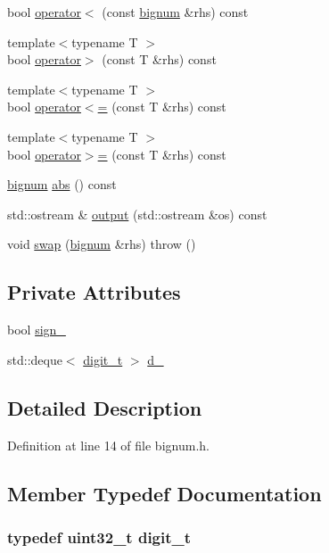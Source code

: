 \begin{DoxyCompactItemize}
\item 
bool \hyperlink{classyuh_1_1bignum_a87acfbb9e05a7e9397fb4197f1aef15e}{operator$<$} (const \hyperlink{classyuh_1_1bignum}{bignum} \&rhs) const 
\item 
{\footnotesize template$<$typename T $>$ }\\bool \hyperlink{classyuh_1_1bignum_a310350936155d69f5221385286b8d41a}{operator$>$} (const \-T \&rhs) const 
\item 
{\footnotesize template$<$typename T $>$ }\\bool \hyperlink{classyuh_1_1bignum_a9b2f684eb4afa9b87a675f6e08b2e736}{operator$<$=} (const \-T \&rhs) const 
\item 
{\footnotesize template$<$typename T $>$ }\\bool \hyperlink{classyuh_1_1bignum_a5dd21374e4d89562f17cfbdd1871b071}{operator$>$=} (const \-T \&rhs) const 
\item 
\hyperlink{classyuh_1_1bignum}{bignum} \hyperlink{classyuh_1_1bignum_acc6083b33ba866bc4a6fff75dc174d47}{abs} () const 
\item 
std\-::ostream \& \hyperlink{classyuh_1_1bignum_a69af91144248517b0357cc4ab7ffa52c}{output} (std\-::ostream \&os) const 
\item 
void \hyperlink{classyuh_1_1bignum_ad64d450e413ed7795476254d1425b677}{swap} (\hyperlink{classyuh_1_1bignum}{bignum} \&rhs)  throw ()
\end{DoxyCompactItemize}
\subsection*{\-Private \-Attributes}
\begin{DoxyCompactItemize}
\item 
bool \hyperlink{classyuh_1_1bignum_abf0bf01a903f906b194bf9f01ff2aab8}{sign\-\_\-}
\item 
std\-::deque$<$ \hyperlink{classyuh_1_1bignum_a918fd2d7b4fcfb6452272f1477745a53}{digit\-\_\-t} $>$ \hyperlink{classyuh_1_1bignum_af9e1efe49c7f3e8ca8889493abee7cfa}{d\-\_\-}
\end{DoxyCompactItemize}


\subsection{\-Detailed \-Description}


\-Definition at line 14 of file bignum.\-h.



\subsection{\-Member \-Typedef \-Documentation}
\hypertarget{classyuh_1_1bignum_a918fd2d7b4fcfb6452272f1477745a53}{
\subsubsection[{digit\-\_\-t}]{\setlength{\rightskip}{0pt plus 5cm}typedef uint32\-\_\-t {\bf digit\-\_\-t}}}\label{d7/d6b/classyuh_1_1bignum_a918fd2d7b4fcfb6452272f1477745a53}


